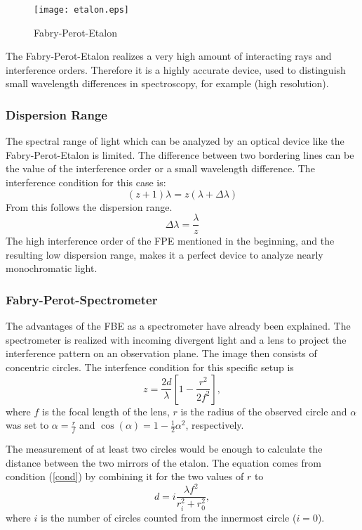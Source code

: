 \documentclass[a4paper,10pt]{article}
\begin{document}
\begin{figure}[htb]
    \centering
    \texttt{[image: etalon.eps]}
    \caption{Fabry-Perot-Etalon}
    \label{fab}
\end{figure}

The Fabry-Perot-Etalon realizes a very high amount of interacting rays and interference orders. Therefore it is a highly accurate device, used to distinguish small wavelength differences in spectroscopy, for example (high resolution).

\subsubsection*{Dispersion Range}
The spectral range of light which can be analyzed by an optical device like the Fabry-Perot-Etalon is limited. The difference between two bordering lines can be the value of the interference order or a small wavelength difference. The interference condition for this case is:
\begin{equation}
(z+1) \lambda = z (\lambda + \Delta\lambda)
\end{equation}
From this follows the dispersion range.
\begin{equation}
\Delta\lambda = \frac{\lambda}{z}
\end{equation}
The high interference order of the FPE mentioned in the beginning, and the resulting low dispersion range, makes it a perfect device to analyze nearly monochromatic light.

\subsubsection*{Fabry-Perot-Spectrometer}
The advantages of the FBE as a spectrometer have already been explained. The spectrometer is realized with incoming divergent light and a lens to project the interference pattern on an observation plane. The image then consists of concentric circles. The interfence condition for this specific setup is
\begin{equation}
z = \frac{2 d}{\lambda}\left[1-\frac{r^2}{2 f^2}\right], \label{cond}
\end{equation}
where $f$ is the focal length of the lens, $r$ is the radius of the observed circle and $\alpha$ was set to $\alpha=\frac{r}{f}$ and $\cos(\alpha)=1-\frac{1}{2}\alpha^2$, respectively.

The measurement of at least two circles would be enough to calculate the distance between the two mirrors of the etalon. The equation comes from condition (\ref{cond}) by combining it for the two values of $r$ to
\begin{equation}
d = i \frac{\lambda f^2}{r_i^2 + r_0^2}, \label{dist}
\end{equation}
where $i$ is the number of circles counted from the innermost circle ($i=0$).
\end{document}
